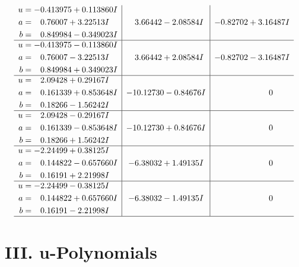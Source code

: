 \documentclass[1p]{elsarticle_modified}
\theoremstyle{definition}
\begin{document}
$$\begin{array}{c|c|c}
\begin{aligned}
u &= -0.413975 + 0.113860 I \\
a &= \phantom{-}0.76007 + 3.22513 I \\
b &= \phantom{-}0.849984 - 0.349023 I\end{aligned}
 & \phantom{-}3.66442 - 2.08584 I & -0.82702 + 3.16487 I \\ \hline\begin{aligned}
u &= -0.413975 - 0.113860 I \\
a &= \phantom{-}0.76007 - 3.22513 I \\
b &= \phantom{-}0.849984 + 0.349023 I\end{aligned}
 & \phantom{-}3.66442 + 2.08584 I & -0.82702 - 3.16487 I \\ \hline\begin{aligned}
u &= \phantom{-}2.09428 + 0.29167 I \\
a &= \phantom{-}0.161339 + 0.853648 I \\
b &= \phantom{-}0.18266 - 1.56242 I\end{aligned}
 & -10.12730 - 0.84676 I & \phantom{-0.000000 } 0 \\ \hline\begin{aligned}
u &= \phantom{-}2.09428 - 0.29167 I \\
a &= \phantom{-}0.161339 - 0.853648 I \\
b &= \phantom{-}0.18266 + 1.56242 I\end{aligned}
 & -10.12730 + 0.84676 I & \phantom{-0.000000 } 0 \\ \hline\begin{aligned}
u &= -2.24499 + 0.38125 I \\
a &= \phantom{-}0.144822 - 0.657660 I \\
b &= \phantom{-}0.16191 + 2.21998 I\end{aligned}
 & -6.38032 + 1.49135 I & \phantom{-0.000000 } 0 \\ \hline\begin{aligned}
u &= -2.24499 - 0.38125 I \\
a &= \phantom{-}0.144822 + 0.657660 I \\
b &= \phantom{-}0.16191 - 2.21998 I\end{aligned}
 & -6.38032 - 1.49135 I & \phantom{-0.000000 } 0\\
 \hline 
 \end{array}$$\newpage
\newpage\renewcommand{\arraystretch}{1}
\centering \section*{ III. u-Polynomials}
\end{document}
